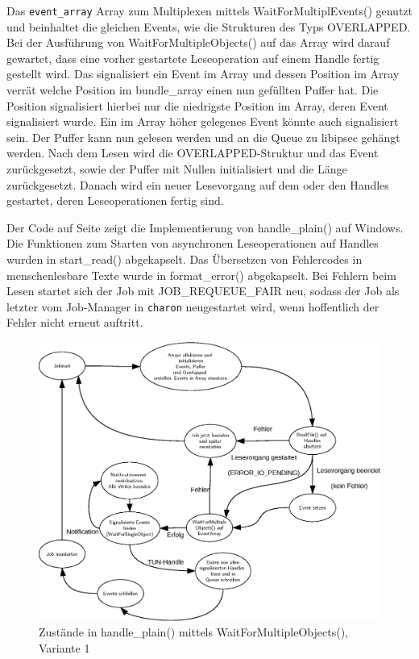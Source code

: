 {Das \texttt{event\_array} Array zum Multiplexen mittels WaitForMultiplEvents() genutzt und
beinhaltet die gleichen Events, wie die Strukturen des Typs OVERLAPPED.
Bei der Ausführung von WaitForMultipleObjects() auf das Array wird darauf gewartet, dass
eine vorher gestartete Leseoperation auf einem Handle fertig gestellt wird.
Das signalisiert ein Event im Array und dessen Position im Array verrät welche
Position im bundle\_array einen nun gefüllten Puffer hat. Die Position signalisiert
hierbei nur die niedrigste Position im Array, deren Event signalisiert wurde. Ein
im Array höher gelegenes Event könnte auch signalisiert sein.
Der Puffer kann nun gelesen
werden und an die Queue zu libipsec gehängt werden. Nach dem Lesen wird die OVERLAPPED-Struktur
und das Event zurückgesetzt, sowie der Puffer mit Nullen initialisiert und die Länge zurückgesetzt.
Danach wird ein neuer Lesevorgang auf dem oder den Handles gestartet, deren Leseoperationen
fertig sind.

Der Code auf Seite \pageref{lst:handle-plain-windows} zeigt die Implementierung von handle\_plain()
auf Windows. Die Funktionen zum Starten von asynchronen Leseoperationen auf Handles
wurden in start\_read() abgekapselt. Das Übersetzen von Fehlercodes in menschenlesbare
Texte wurde in format\_error() abgekapselt. Bei Fehlern beim Lesen startet sich der Job
mit JOB\_REQUEUE\_FAIR neu, sodass der Job als letzter vom Job-Manager in \texttt{charon} neugestartet wird,
wenn hoffentlich der Fehler nicht erneut auftritt.

\begin{figure}
\centering
\def\svgwidth{\columnwidth}
\includegraphics[width=\textwidth]{WaitForMultipleObjects.eps}
\caption{Zustände in handle\_plain() mittels WaitForMultipleObjects(), Variante 1}
\label{fig:WaitForMultipleObjects}
\end{figure}

}

